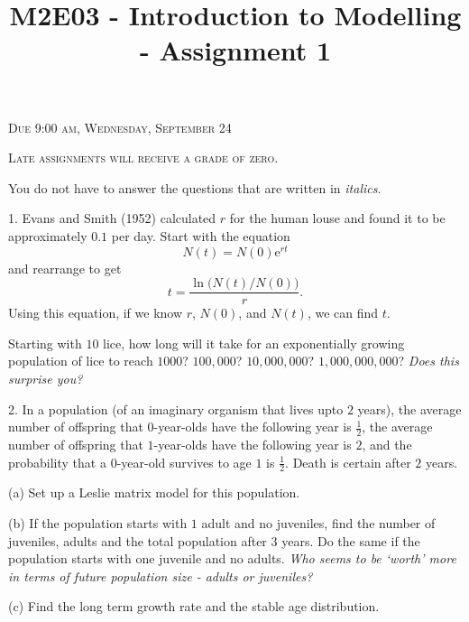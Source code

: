 \documentclass[reqno,12pt]{amsart}
\theoremstyle{definition}
\theoremstyle{remark}
\numberwithin{equation}{section}
\def\eee{\textrm{e}}
\begin{document}
\title{M2E03 - Introduction to Modelling - Assignment 1}
\maketitle

\begin{center}
\pagestyle{myheadings} 
\thispagestyle{empty}

\bigskip

\textsc{Due 9:00 am, Wednesday, September 24}

\bigskip

\textsc{Late assignments will receive a grade of zero.}

\bigskip

You do not have to answer the questions that are written in {\it italics}.

\bigskip
\bigskip
\end{center}

1.  Evans and Smith (1952) calculated $r$ for the human louse and
found it to be approximately $0.1$ per day.  Start with the equation
$$
N(t) = N(0) \eee^{rt}
$$
and rearrange to get
$$
t = \frac{\ln \bigl( N(t) / N(0) \bigr)}r.
$$
Using this equation, if we know $r$, $N(0)$, and $N(t)$, we can
find $t$.

Starting with $10$ lice, how long will it take for an exponentially
growing population of lice to reach $1000$?  $100,000$?  $10,000,000$?
$1,000,000,000$?  {\it Does this surprise you?}

\bigskip

2.  In a population (of an imaginary organism that lives upto $2$ years),
the average number of offspring that $0$-year-olds have the following
year is $\frac 12$, the average number of offspring that $1$-year-olds
have the following year is $2$, and the probability that a $0$-year-old
survives to age $1$ is $\frac 12$.  Death is certain after $2$ years.

\noindent
(a) Set up a Leslie matrix model for this population.

\noindent
(b) If the population starts with $1$ adult and no juveniles, find the
number of juveniles, adults and the total population after $3$ years.
Do the same if the population starts with one juvenile and no adults.
{\it Who seems to be `worth' more in terms of future population size
- adults or juveniles?}

\noindent
(c) Find the long term growth rate and the stable age distribution.

\bigskip
\end{document}
